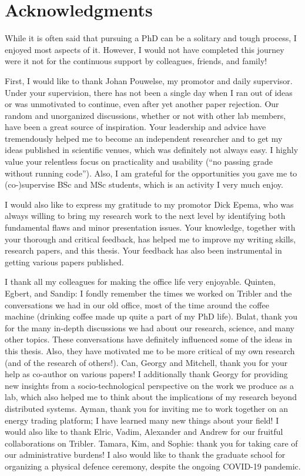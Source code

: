 \chapter*{Acknowledgments}

While it is often said that pursuing a PhD can be a solitary and tough process, I enjoyed most aspects of it.
However, I would not have completed this journey were it not for the continuous support by colleagues, friends, and family!

First, I would like to thank Johan Pouwelse, my promotor and daily supervisor.
Under your supervision, there has not been a single day when I ran out of ideas or was unmotivated to continue, even after yet another paper rejection.
Our random and unorganized discussions, whether or not with other lab members, have been a great source of inspiration.
Your leadership and advice have tremendously helped me to become an independent researcher and to get my ideas published in scientific venues, which was definitely not always easy.
I highly value your relentless focus on practicality and usability (\enquote{no passing grade without running code}).
Also, I am grateful for the opportunities you gave me to (co-)supervise BSc and MSc students, which is an activity I very much enjoy.

I would also like to express my gratitude to my promotor Dick Epema, who was always willing to bring my research work to the next level by identifying both fundamental flaws and minor presentation issues.
Your knowledge, together with your thorough and critical feedback, has helped me to improve my writing skills, research papers, and this thesis.
Your feedback has also been instrumental in getting various papers published.

I thank all my colleagues for making the office life very enjoyable.
Quinten, Egbert, and Sandip: I fondly remember the times we worked on Tribler and the conversations we had in our old office, most of the time around the coffee machine (drinking coffee made up quite a part of my PhD life\emojicoffee{}).
Bulat, thank you for the many in-depth discussions we had about our research, science, and many other topics.
These conversations have definitely influenced some of the ideas in this thesis. Also, they have motivated me to be more critical of my own research (and of the research of others!).
Can, Georgy and Mitchell, thank you for your help as co-author on various papers!
I additionally thank Georgy for providing new insights from a socio-technological perspective on the work we produce as a lab, which also helped me to think about the implications of my research beyond distributed systems.
Ayman, thank you for inviting me to work together on an energy trading platform; I have learned many new things about your field!
I would also like to thank Elric, Vadim, Alexander and Andrew for our fruitful collaborations on Tribler.
Tamara, Kim, and Sophie: thank you for taking care of our administrative burdens!
I also would like to thank the graduate school for organizing a physical defence ceremony, despite the ongoing COVID-19 pandemic.

